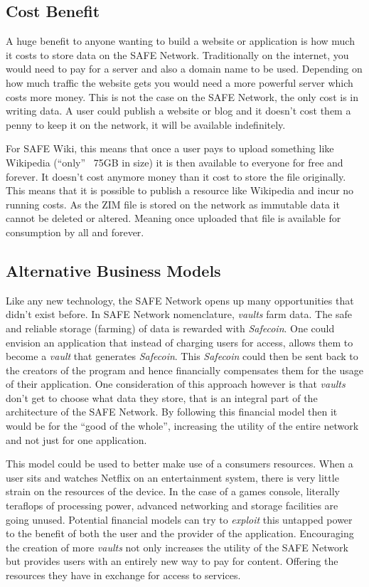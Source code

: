 \subsection{Cost Benefit}
 
A huge benefit to anyone wanting to build a website or application is how much it costs to store data on the SAFE Network. Traditionally on the internet, you would need to pay for a server and also a domain name to be used. Depending on how much traffic the website gets you would need a more powerful server which costs more money. This is not the case on the SAFE Network, the only cost is in writing data. A user could publish a website or blog and it doesn't cost them a penny to keep it on the network, it will be available indefinitely.
 
For SAFE Wiki, this means that once a user pays to upload something like Wikipedia (``only'' ~75GB in size) it is then available to everyone for free and forever. It doesn't cost anymore money than it cost to store the file originally. This means that it is possible to publish a resource like Wikipedia and incur no running costs. As the ZIM file is stored on the network as immutable data it cannot be deleted or altered. Meaning once uploaded that file is available for consumption by all and forever.
 
\subsection{Alternative Business Models}

Like any new technology, the SAFE Network opens up many opportunities that didn't exist before. In SAFE Network nomenclature, \textit{vaults} farm data. The safe and reliable storage (farming) of data is rewarded with \textit{Safecoin}. One could envision an application that instead of charging users for access, allows them to become a \textit{vault} that generates \textit{Safecoin}. This \textit{Safecoin} could then be sent back to the creators of the program and hence financially compensates them for the usage of their application. One consideration of this approach however is that \textit{vaults} don't get to choose what data they store, that is an integral part of the architecture of the SAFE Network. By following this financial model then it would be for the ``good of the whole'', increasing the utility of the entire network and not just for one application.

This model could be used to better make use of a consumers resources. When a user sits and watches Netflix on an entertainment system, there is very little strain on the resources of the device. In the case of a games console, literally teraflops of processing power, advanced networking and storage facilities are going unused. Potential financial models can try to \textit{exploit} this untapped power to the benefit of both the user and the provider of the application. Encouraging the creation of more \textit{vaults} not only increases the utility of the SAFE Network but provides users with an entirely new way to pay for content. Offering the resources they have in exchange for access to services.

